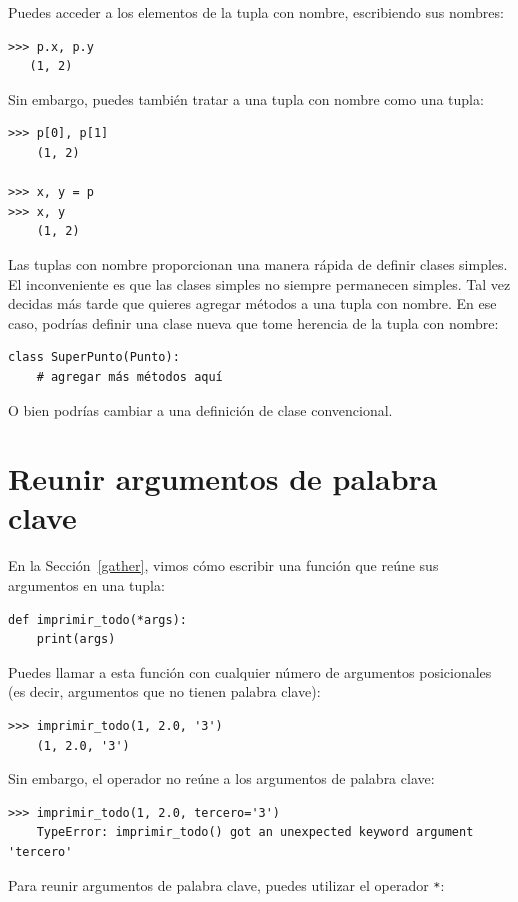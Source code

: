 \documentclass[10pt]{book}
\begin{document}
Puedes acceder a los elementos de la tupla con nombre, escribiendo sus nombres:

\begin{verbatim}
>>> p.x, p.y
   (1, 2)
\end{verbatim}

Sin embargo, puedes también tratar a una tupla con nombre como una tupla:

\begin{verbatim}
>>> p[0], p[1]
    (1, 2)

>>> x, y = p
>>> x, y
    (1, 2)
\end{verbatim}

Las tuplas con nombre proporcionan una manera rápida de definir clases simples.
El inconveniente es que las clases simples no siempre permanecen simples.
Tal vez decidas más tarde que quieres agregar métodos a una tupla con nombre.
En ese caso, podrías definir una clase nueva que tome herencia de
la tupla con nombre:

\begin{verbatim}
class SuperPunto(Punto):
    # agregar más métodos aquí
\end{verbatim}

O bien podrías cambiar a una definición de clase convencional.


\section{Reunir argumentos de palabra clave}

En la Sección~\ref{gather}, vimos cómo escribir una función que
reúne sus argumentos en una tupla:

\begin{verbatim}
def imprimir_todo(*args):
    print(args)
\end{verbatim}
%
Puedes llamar a esta función con cualquier número de argumentos posicionales
(es decir, argumentos que no tienen palabra clave):

\begin{verbatim}
>>> imprimir_todo(1, 2.0, '3')
    (1, 2.0, '3')
\end{verbatim}
%
Sin embargo, el operador {\tt *} no reúne a los argumentos de palabra clave:

\begin{verbatim}
>>> imprimir_todo(1, 2.0, tercero='3')
    TypeError: imprimir_todo() got an unexpected keyword argument 'tercero'
\end{verbatim}
%
Para reunir argumentos de palabra clave, puedes utilizar el operador {\tt **}:
\end{document}
